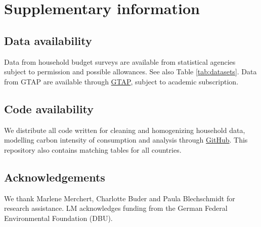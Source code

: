 \documentclass[12pt, a4paper]{article}
\begin{document}

\clearpage


\clearpage


\clearpage

\section{Supplementary information}

\subsection{Data availability} \label{data_availability} Data from household budget surveys are available from statistical agencies subject to permission and possible allowances. See also Table \ref{tab:datasets}. Data from GTAP are available through \href{https://www.gtap.agecon.purdue.edu/}{GTAP}, subject to academic subscription.  

\subsection{Code availability} \label{code}
We distribute all code written for cleaning and homogenizing household data, modelling carbon intensity of consumption and analysis through \href{https://github.com/lmissbach/Carbon-Intensity-2023}{GitHub}. This repository also contains matching tables for all countries.

\subsection{Acknowledgements} \label{acknowledgements}

We thank Marlene Merchert, Charlotte Buder and Paula Blechschmidt for research assistance. LM acknowledges funding from the German Federal Environmental Foundation (DBU).
\end{document}
